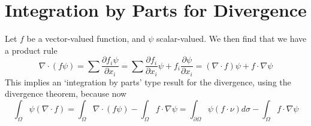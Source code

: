 \section{Integration by Parts for Divergence}

Let $f$ be a vector-valued function, and $\psi$ scalar-valued. We then find that we have a product rule
%
\[ \nabla \cdot (f \psi) = \sum \frac{\partial f_i \psi}{\partial x_i} = \sum \frac{\partial f_i}{\partial x_i} \psi + f_i \frac{\partial \psi}{\partial x_i} = (\nabla \cdot f) \psi + f \cdot \nabla \psi \]
%
This implies an `integration by parts' type result for the divergence, using the divergence theorem, because now
%
\[ \int_\Omega \psi (\nabla \cdot f) = \int_\Omega \nabla \cdot (f \psi) - \int_\Omega f \cdot \nabla \psi = \int_{\partial \Omega} \psi(f \cdot \nu) d\sigma - \int_\Omega f \cdot \nabla \psi \]

